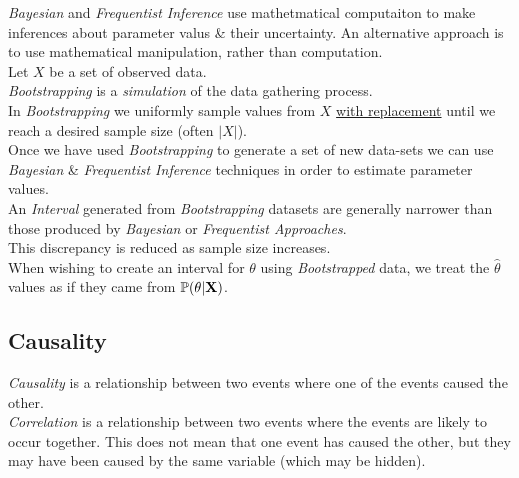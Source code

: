 \documentclass[11pt,a4paper]{article}
\begin{document}
\textit{Bayesian} and \textit{Frequentist Inference} use mathetmatical computaiton to make inferences about parameter valus \& their uncertainty. An alternative approach is to use mathematical manipulation, rather than computation.\\

Let $X$ be a set of observed data.\\
\textit{Bootstrapping} is a \textit{simulation} of the data gathering process.\\
In \textit{Bootstrapping} we uniformly sample values from $X$ \underline{with replacement} until we reach a desired sample size (often $|X|$).\\

Once we have used \textit{Bootstrapping} to generate a set of new data-sets we can use \textit{Bayesian} \& \textit{Frequentist Inference} techniques in order to estimate parameter values.\\

An \textit{Interval} generated from \textit{Bootstrapping} datasets are generally narrower than those produced by \textit{Bayesian} or \textit{Frequentist Approaches}.\\
\nb This discrepancy is reduced as sample size increases.\\

When wishing to create an interval for $\theta$ using \textit{Bootstrapped} data, we treat the $\hat\theta$ values as if they came from $\mathbb{P}(\theta|\textbf{X})$.

\subsection{Causality}

\textit{Causality} is a relationship between two events where one of the events caused the other.\\

\textit{Correlation} is a relationship between two events where the events are likely to occur together. This does not mean that one event has caused the other, but they may have been caused by the same variable (which may be hidden).\\

\end{document}
